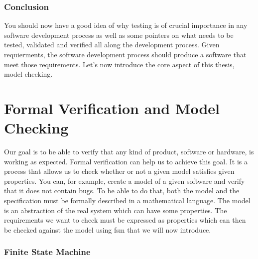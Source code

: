 \documentclass[12pt]{article}
\theoremstyle{definition}
\theoremstyle{definition}
\theoremstyle{remark}
\begin{document}
\section{Conclusion}


You should now have a good idea of why testing is of crucial importance in any software development process as well as some pointers on what needs to be tested, validated and verified all along the development process. Given requierments, the software development process should produce a software that meet those requirements. Let's now introduce the core aspect of this thesis, model checking.



\clearpage
\part{Formal Verification and Model Checking}\label{ModelChecking}

Our goal is to be able to verify that any kind of product, software or hardware, is working as expected. Formal verification can help us to achieve this goal. It is a process that allows us to check whether or not a given model satisfies given properties. You can, for example, create a model of a given software and verify that it does not contain bugs. To be able to do that, both the model and the specification must be formally described in a mathematical language. The model is an abstraction of the real system which can have some properties. The requirements we want to check must be expressed as properties which can then be checked against the model using \gls{fsm} that we will now introduce.\\


\clearpage



\section{Finite State Machine}
\end{document}
